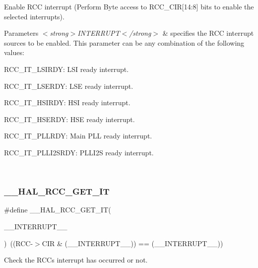 Enable R\+CC interrupt (Perform Byte access to R\+C\+C\+\_\+\+C\+IR\mbox{[}14\+:8\mbox{]} bits to enable the selected interrupts). 


\begin{DoxyParams}{Parameters}
{\em $<$strong$>$\+I\+N\+T\+E\+R\+R\+U\+P\+T$<$/strong$>$} & specifies the R\+CC interrupt sources to be enabled. This parameter can be any combination of the following values\+: \begin{DoxyItemize}
\item R\+C\+C\+\_\+\+I\+T\+\_\+\+L\+S\+I\+R\+DY\+: L\+SI ready interrupt. \item R\+C\+C\+\_\+\+I\+T\+\_\+\+L\+S\+E\+R\+DY\+: L\+SE ready interrupt. \item R\+C\+C\+\_\+\+I\+T\+\_\+\+H\+S\+I\+R\+DY\+: H\+SI ready interrupt. \item R\+C\+C\+\_\+\+I\+T\+\_\+\+H\+S\+E\+R\+DY\+: H\+SE ready interrupt. \item R\+C\+C\+\_\+\+I\+T\+\_\+\+P\+L\+L\+R\+DY\+: Main P\+LL ready interrupt. \item R\+C\+C\+\_\+\+I\+T\+\_\+\+P\+L\+L\+I2\+S\+R\+DY\+: P\+L\+L\+I2S ready interrupt. \end{DoxyItemize}
\\
\hline
\end{DoxyParams}
\mbox{\label{group___r_c_c___flags___interrupts___management_ga134af980b892f362c05ae21922cd828d}} 
\subsubsection{\texorpdfstring{\_\_HAL\_RCC\_GET\_IT}{\_\_HAL\_RCC\_GET\_IT}}
{\footnotesize\ttfamily \#define \+\_\+\+\_\+\+H\+A\+L\+\_\+\+R\+C\+C\+\_\+\+G\+E\+T\+\_\+\+IT(\begin{DoxyParamCaption}\item[{}]{\+\_\+\+\_\+\+I\+N\+T\+E\+R\+R\+U\+P\+T\+\_\+\+\_\+ }\end{DoxyParamCaption})~((R\+CC-\/$>$C\+IR \& (\+\_\+\+\_\+\+I\+N\+T\+E\+R\+R\+U\+P\+T\+\_\+\+\_\+)) == (\+\_\+\+\_\+\+I\+N\+T\+E\+R\+R\+U\+P\+T\+\_\+\+\_\+))}



Check the R\+CC\textquotesingle{}s interrupt has occurred or not. 


